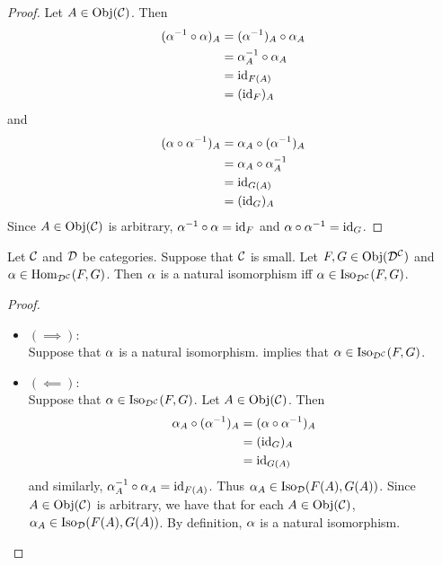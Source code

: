 \documentclass{book}
\begin{document}
	\begin{proof}
		Let $A \in \operatorname{Obj}(\mathcal{C})$. Then 
		\begin{align*}
			(\alpha^{-1} \circ \alpha )_A 
			& = (\alpha^{-1})_A \circ \alpha_A \\
			& = \alpha_A^{-1} \circ \alpha_A \\
			& = \operatorname{id}_{F(A)} \\
			& = (\operatorname{id}_F)_A
		\end{align*}
		and 
		\begin{align*}
			(\alpha \circ \alpha^{-1} )_A 
			& = \alpha_A \circ (\alpha^{-1})_A\\
			& = \alpha_A \circ \alpha_A^{-1}\\
			& = \operatorname{id}_{G(A)} \\
			& = (\operatorname{id}_G)_A
		\end{align*}
		Since $A \in \operatorname{Obj}(\mathcal{C})$ is arbitrary, $\alpha^{-1} \circ \alpha = \operatorname{id}_F$ and $\alpha \circ \alpha^{-1} = \operatorname{id}_G$.
	\end{proof}
	
	\begin{ex} 
		Let $\mathcal{C}$ and $\mathcal{D}$ be categories. Suppose that $\mathcal{C}$ is small. Let $F,G \in \operatorname{Obj}(\mathcal{D}^{\mathcal{C}})$ and $\alpha \in \operatorname{Hom}_{\mathcal{D}^{\mathcal{C}}}(F, G)$. Then $\alpha$ is a natural isomorphism iff $\alpha \in \operatorname{Iso}_{\mathcal{D}^{\mathcal{C}}}(F, G)$. 
	\end{ex}

	\begin{proof}\
		\begin{itemize}
			\item $(\implies)$: \\
			Suppose that $\alpha$ is a natural isomorphism.  implies that $\alpha \in \operatorname{Iso}_{\mathcal{D}^{\mathcal{C}}}(F, G)$. 
			\item $(\impliedby)$: \\
			Suppose that $\alpha \in \operatorname{Iso}_{\mathcal{D}^{\mathcal{C}}}(F, G)$. Let $A \in \operatorname{Obj}(\mathcal{C})$. Then 
			\begin{align*}
				\alpha_A \circ (\alpha^{-1})_A
				& = (\alpha \circ \alpha^{-1})_A \\
				& = (\operatorname{id}_{G})_A \\
				& = \operatorname{id}_{G(A)} \\
			\end{align*}
			and similarly, $\alpha_A^{-1} \circ \alpha_A = \operatorname{id}_{F(A)}$. Thus $\alpha_A \in \operatorname{Iso}_{\mathcal{D}}(F(A), G(A))$. Since $A \in \operatorname{Obj}(\mathcal{C})$ is arbitrary, we have that for each $A \in \operatorname{Obj}(\mathcal{C})$, $\alpha_A \in \operatorname{Iso}_{\mathcal{D}}(F(A), G(A))$. By definition, $\alpha$ is a natural isomorphism.
		\end{itemize}
	\end{proof}
\end{document}
